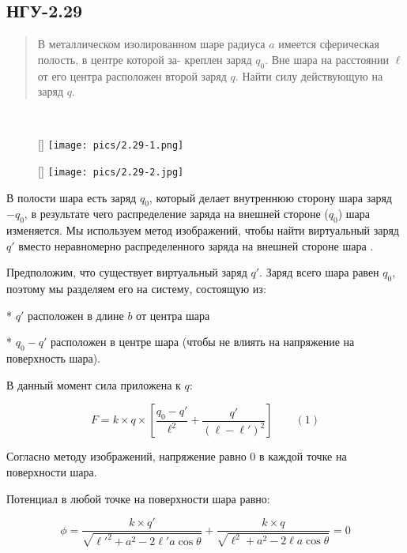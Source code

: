 \subsection*{НГУ-2.29}

\setcounter{equation}{0}

\begin{abstract}
В металлическом изолированном шаре радиуса $a$ имеется сферическая полость, в центре которой за-
креплен заряд $q_0$. Вне шара на расстоянии $\ell$ от его центра расположен второй заряд $q$. Найти силу действующую на заряд $q$.
\end{abstract}

\noindent \hrulefill
\\
\begin{wrapfigure}[6]{r}{0.30\textwidth}
	\raisebox{0pt}[\dimexpr{}\baselineskip\relax]{
	\texttt{[image: pics/2.29-1.png]}}
\end{wrapfigure}

\begin{wrapfigure}[6]{r}{0.30\textwidth}
	\raisebox{0pt}[\dimexpr{}\baselineskip\relax]{
	\texttt{[image: pics/2.29-2.jpg]}}
\end{wrapfigure}

В полости шара есть заряд $q_0$, который делает внутреннюю сторону шара заряд $-q_0$, в результате чего распределение заряда на внешней стороне ($q_0$) шара изменяется. Мы используем метод изображений, чтобы найти виртуальный заряд $q'$ вместо неравномерно распределенного заряда на внешней стороне шара .


Предположим, что существует виртуальный заряд $q'$. Заряд всего шара равен $q_0$, поэтому мы разделяем его на систему, состоящую из: 

* $q'$ расположен в длине $b$ от центра шара

* $q_0 - q'$ расположен в центре шара (чтобы не влиять на напряжение на поверхность шара). 

В данный момент сила приложена к $q$:

$$F = k \times q \times[\frac{q_0-q'}{\ell^2} + \frac{q'}{(\ell-\ell')^2}] 
 \qquad(1)$$

Согласно методу изображений, напряжение равно 0 в каждой точке на поверхности шара.

Потенциал в любой точке на поверхности шара равно:

$$\phi = \frac{k \times q'}{\sqrt{\ell'^2+a^2-2\ell'a \cos{\theta}}} + \frac{k \times q}{\sqrt{\ell^2+a^2-2\ell a \cos{\theta}}} = 0$$

